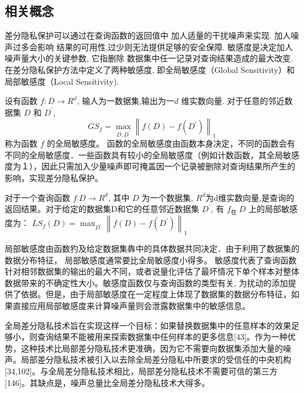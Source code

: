 \subsection{相关概念}
差分隐私保护可以通过在查询函数的返回值中 加人适量的干扰噪声来实现. 加人噪声过多会影响 结果的可用性,过少则无法提供足够的安全保障. 敏感度是决定加人噪声量大小的关键参数, 它指删除 数据集中任一记录对查询结果造成的最大改变. 在差分隐私保护方法中定义了两种敏感度, 即全局敏感度（Global Sensitivity）和局部敏感度（Local Sensitivity).

\begin{define}[全局敏感度]\label{全局敏感度}
设有函数 $f: D \rightarrow R^{d}$, 输人为一数据集,输出为一$d$ 维实数向量. 对于任意的邻近数据集 $D$ 和 $D^{\prime}$,
$$
G S_{f}=\max _{D, D^{\prime}}\left\|f(D)-f\left(D^{\prime}\right)\right\|_{1}
$$
称为函数 $f$ 的全局敏感度。
函数的全局敏感度由函数本身决定，不同的函数会有不同的全局敏感度．一些函数具有较小的全局敏感度（例如计数函数，其全局敏感度为１），因此只需加入少量噪声即可掩盖因一个记录被删除对查询结果所产生的影响，实现差分隐私保护。
\end{define}

\begin{define}[局部敏感度]\label{局部敏感度}
对于一个查询函数 $f_{:} D \rightarrow R^{d}$, 其中 $D$ 为一个数据集, $R^{d}$为d维实数向量,是查询的返回结果。对于给定的数据集D和它的任意邻近数据集 $D^{\prime}$, 有 $f_{\text {在 }} D$ 上的局部敏感度为：
$L S_{f}(D)=\max _{D^{\prime}}\left\|f(D)-f\left(D^{\prime}\right)\right\|_{1}$

局部敏感度由函数犳及给定数据集犇中的具体数据共同决定．由于利用了数据集的数据分布特征， 局部敏感度通常要比全局敏感度小得多。
敏感度代表了查询函数针对相邻数据集的输出的最大不同，或者说量化评估了最坏情况下单个样本对整体数据带来的不确定性大小。敏感度函数仅与查询函数的类型有关, 为扰动的添加提供了依据。但是，由于局部敏感度在一定程度上体现了数据集的数据分布特征，如果直接应用局部敏感度来计算噪声量则会泄露数据集中的敏感信息。
\end{define}

全局差分隐私技术旨在实现这样一个目标：如果替换数据集中的任意样本的效果足够小，则查询结果不能被用来探索数据集中任何样本的更多信息[43]。作为一种优势，这种技术比局部差分隐私技术更准确，因为它不需要向数据集添加大量的噪声。局部差分隐私技术被引入以去除全局差分隐私中所要求的受信任的中央机构[34,102]。与全局差分隐私技术相比，局部差分隐私技术不需要可信的第三方[146]。其缺点是，噪声总量比全局差分隐私技术大得多。

